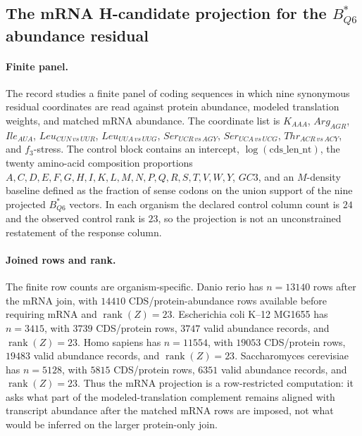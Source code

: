 \subsection{The mRNA H-candidate projection for the $B^*_{Q6}$ abundance residual}\label{subsec:bior-hcandidate-mrna-bstar-q6-abundance-residual}

\paragraph{Finite panel.} The record studies a finite panel of coding sequences in which nine synonymous residual coordinates are read against protein abundance, modeled translation weights, and matched mRNA abundance.  The coordinate list is
$K_{AAA}$, $Arg_{AGR}$, $Ile_{AUA}$, $Leu_{CUN\,vs\,UUR}$, $Leu_{UUA\,vs\,UUG}$, $Ser_{UCR\,vs\,AGY}$, $Ser_{UCA\,vs\,UCG}$, $Thr_{ACR\,vs\,ACY}$, and $f_3$-stress.  The control block contains an intercept, $\log(\mathrm{cds\_len\_nt})$, the twenty amino-acid composition proportions $A,C,D,E,F,G,H,I,K,L,M,N,P,Q,R,S,T,V,W,Y$, $GC3$, and an $M$-density baseline defined as the fraction of sense codons on the union support of the nine projected $B^*_{Q6}$ vectors.  In each organism the declared control column count is $24$ and the observed control rank is $23$, so the projection is not an unconstrained restatement of the response column.

\paragraph{Joined rows and rank.} The finite row counts are organism-specific.  Danio rerio has $n=13140$ rows after the mRNA join, with $14410$ CDS/protein-abundance rows available before requiring mRNA and $\operatorname{rank}(Z)=23$.  Escherichia coli K--12 MG1655 has $n=3415$, with $3739$ CDS/protein rows, $3747$ valid abundance records, and $\operatorname{rank}(Z)=23$.  Homo sapiens has $n=11554$, with $19053$ CDS/protein rows, $19483$ valid abundance records, and $\operatorname{rank}(Z)=23$.  Saccharomyces cerevisiae has $n=5128$, with $5815$ CDS/protein rows, $6351$ valid abundance records, and $\operatorname{rank}(Z)=23$.  Thus the mRNA projection is a row-restricted computation: it asks what part of the modeled-translation complement remains aligned with transcript abundance after the matched mRNA rows are imposed, not what would be inferred on the larger protein-only join.

